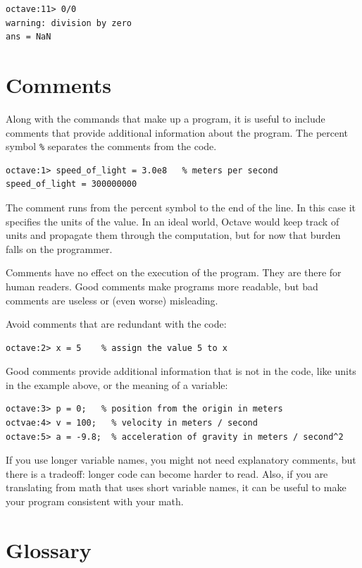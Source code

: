 \documentclass{book}
\begin{document}
\begin{verbatim}
octave:11> 0/0
warning: division by zero
ans = NaN
\end{verbatim}


\section{Comments}

Along with the commands that make up a program, it is useful
to include comments that provide additional information about the
program. The percent symbol {\tt \%} separates
the comments from the code.

\begin{verbatim}
octave:1> speed_of_light = 3.0e8   % meters per second
speed_of_light = 300000000
\end{verbatim}

The comment runs from the percent symbol to the end of the line.
In this case it specifies the units of the value. In an ideal world,
Octave would keep track of units and propagate them through the
computation, but for now that burden falls on the programmer.

Comments have no effect on the execution of the program. They
are there for human readers. Good comments make programs more
readable, but bad comments are useless or (even worse) misleading.

Avoid comments that are redundant with the code:

\begin{verbatim}
octave:2> x = 5    % assign the value 5 to x
\end{verbatim}

Good comments provide additional information that is not in the
code, like units in the example above, or the meaning of a variable:

\begin{verbatim}
octave:3> p = 0;   % position from the origin in meters 
octvae:4> v = 100;   % velocity in meters / second
octave:5> a = -9.8;  % acceleration of gravity in meters / second^2
\end{verbatim}

If you use longer variable names, you might not need explanatory
comments, but there is a tradeoff: longer code can become harder
to read. Also, if you are translating from math
that uses short variable names, it can be useful to make your
program consistent with your math. 

\section{Glossary}
\end{document}
